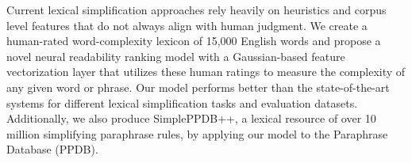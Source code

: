 Current lexical simplification approaches rely heavily on heuristics and corpus level features  that do not always align with human judgment. We create a human-rated word-complexity lexicon of 15,000 English words and propose a novel neural readability ranking model with a Gaussian-based feature vectorization layer that utilizes these human ratings to measure the complexity of any given word or phrase. Our model performs better than the state-of-the-art systems for different lexical simplification tasks and evaluation datasets. Additionally, we also produce SimplePPDB++, a lexical resource of over 10 million simplifying paraphrase rules, by applying our model to the Paraphrase Database (PPDB).
